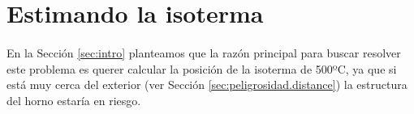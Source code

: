 \documentclass[12pt]{article}
\begin{document}


\section{Estimando la isoterma}
\label{sec:peligrosidad}

\paragraph{} En la Sección \ref{sec:intro} planteamos que la razón principal para buscar resolver este problema es querer calcular la posición de la isoterma de 500ºC, ya que si está muy cerca del exterior (ver Sección \ref{sec:peligrosidad.distance}) la estructura del horno estaría en riesgo.
\end{document}
